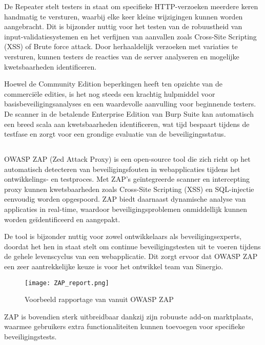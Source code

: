 De Repeater stelt testers in staat om specifieke HTTP-verzoeken meerdere keren handmatig te versturen, waarbij elke keer 
kleine wijzigingen kunnen worden aangebracht. Dit is bijzonder nuttig voor het testen van de robuustheid van 
input-validatiesystemen en het verfijnen van aanvallen zoals Cross-Site Scripting (XSS) of Brute force attack. Door 
herhaaldelijk verzoeken met variaties te versturen, kunnen testers de reacties van de server analyseren en mogelijke 
kwetsbaarheden identificeren.

Hoewel de Community Edition beperkingen heeft ten opzichte van de 
commerciële edities, is het nog steeds een krachtig hulpmiddel voor basisbeveiligingsanalyses en een waardevolle aanvulling 
voor beginnende testers. De scanner in de betalende Enterprise Edition van Burp Suite kan automatisch een breed scala aan kwetsbaarheden 
identificeren, wat tijd bespaart tijdens de testfase en zorgt voor een grondige evaluatie van de beveiligingsstatus.

\subsection{}
OWASP ZAP (Zed Attack Proxy) is een open-source tool die zich richt op het automatisch detecteren van beveiligingsfouten in 
webapplicaties tijdens het ontwikkelings- en testproces. Met ZAP's geïntegreerde scanner en intercepting proxy kunnen 
kwetsbaarheden zoals Cross-Site Scripting (XSS) en SQL-injectie eenvoudig worden opgespoord. ZAP biedt 
daarnaast dynamische analyse van applicaties in real-time, waardoor beveiligingsproblemen onmiddellijk kunnen worden geïdentificeerd 
en aangepakt.

De tool is bijzonder nuttig voor zowel ontwikkelaars als beveiligingsexperts, doordat het hen in staat stelt 
om continue beveiligingstesten uit te voeren tijdens de gehele levenscyclus van een webapplicatie. Dit zorgt ervoor dat 
OWASP ZAP een zeer aantrekkelijke keuze is voor het ontwikkel team van Sinergio.
\begin{figure}
    \centering
    \texttt{[image: ZAP\_report.png]}
    \caption[Voorbeeld rapportage van vanuit OWASP ZAP]{Voorbeeld rapportage van vanuit OWASP ZAP}
    \label{fig:zap_report}
\end{figure}
ZAP is bovendien sterk uitbreidbaar dankzij zijn robuuste add-on marktplaats, waarmee gebruikers extra functionaliteiten 
kunnen toevoegen voor specifieke beveiligingstests. 

